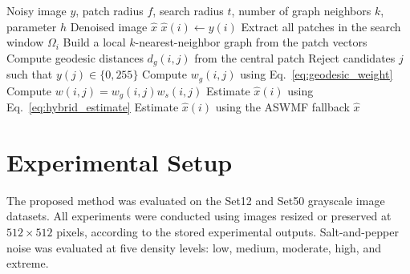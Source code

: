 \documentclass{ieeeaccess}
\begin{document}
\begin{algorithm}
\caption{GEONLMHibrid}
\label{alg:geonlmhibrid}
\begin{algorithmic}[1]
\Require Noisy image $y$, patch radius $f$, search radius $t$, number of graph neighbors $k$, parameter $h$
\Ensure Denoised image $\hat{x}$
        \State $\hat{x}(i) \gets y(i)$
    \Else
        \State Extract all patches in the search window $\Omega_i$
        \State Build a local $k$-nearest-neighbor graph from the patch vectors
        \State Compute geodesic distances $d_g(i,j)$ from the central patch
        \State Reject candidates $j$ such that $y(j)\in\{0,255\}$
        \State Compute $w_g(i,j)$ using Eq.~\eqref{eq:geodesic_weight}
        \State Compute $w(i,j)=w_g(i,j)w_s(i,j)$
            \State Estimate $\hat{x}(i)$ using Eq.~\eqref{eq:hybrid_estimate}
        \Else
            \State Estimate $\hat{x}(i)$ using the ASWMF fallback
        \EndIf
    \EndIf
\EndFor
\State \Return $\hat{x}$
\end{algorithmic}
\end{algorithm}

\section{Experimental Setup}
\label{sec:experiments}

The proposed method was evaluated on the Set12 and Set50 grayscale image datasets. All experiments were conducted using images resized or preserved at $512\times512$ pixels, according to the stored experimental outputs. Salt-and-pepper noise was evaluated at five density levels: low, medium, moderate, high, and extreme.
\end{document}
